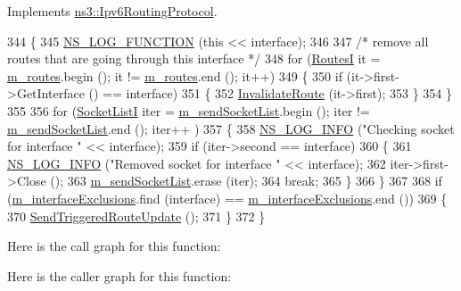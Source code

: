 Implements \hyperlink{classns3_1_1Ipv6RoutingProtocol_aa9b4c21a3878a1b808c9ac9d26c914bf}{ns3\+::\+Ipv6\+Routing\+Protocol}.


\begin{DoxyCode}
344 \{
345   \hyperlink{log-macros-disabled_8h_a90b90d5bad1f39cb1b64923ea94c0761}{NS\_LOG\_FUNCTION} (\textcolor{keyword}{this} << interface);
346 
347   \textcolor{comment}{/* remove all routes that are going through this interface */}
348   \textcolor{keywordflow}{for} (\hyperlink{classns3_1_1RipNg_aa8bc6103d67089e1e3cd507936f94887}{RoutesI} it = \hyperlink{classns3_1_1RipNg_acfc1011b140f9e612a8c27c9bfb4c6b5}{m\_routes}.begin (); it != \hyperlink{classns3_1_1RipNg_acfc1011b140f9e612a8c27c9bfb4c6b5}{m\_routes}.end (); it++)
349     \{
350       \textcolor{keywordflow}{if} (it->first->GetInterface () == interface)
351         \{
352           \hyperlink{classns3_1_1RipNg_ae4fc1ca9ed948f3c028fd96fb016f7dd}{InvalidateRoute} (it->first);
353         \}
354     \}
355 
356   \textcolor{keywordflow}{for} (\hyperlink{classns3_1_1RipNg_a549052bbb55168d029f82d78384144b4}{SocketListI} iter = \hyperlink{classns3_1_1RipNg_a761d304dc3d34cd528afe87c5fa8090b}{m\_sendSocketList}.begin (); iter != 
      \hyperlink{classns3_1_1RipNg_a761d304dc3d34cd528afe87c5fa8090b}{m\_sendSocketList}.end (); iter++ )
357     \{
358       \hyperlink{group__logging_gafbd73ee2cf9f26b319f49086d8e860fb}{NS\_LOG\_INFO} (\textcolor{stringliteral}{"Checking socket for interface "} << interface);
359       \textcolor{keywordflow}{if} (iter->second == interface)
360         \{
361           \hyperlink{group__logging_gafbd73ee2cf9f26b319f49086d8e860fb}{NS\_LOG\_INFO} (\textcolor{stringliteral}{"Removed socket for interface "} << interface);
362           iter->first->Close ();
363           \hyperlink{classns3_1_1RipNg_a761d304dc3d34cd528afe87c5fa8090b}{m\_sendSocketList}.erase (iter);
364           \textcolor{keywordflow}{break};
365         \}
366     \}
367 
368   \textcolor{keywordflow}{if} (\hyperlink{classns3_1_1RipNg_a98c5b63bb7c56afa595c1bb568a7081f}{m\_interfaceExclusions}.find (interface) == 
      \hyperlink{classns3_1_1RipNg_a98c5b63bb7c56afa595c1bb568a7081f}{m\_interfaceExclusions}.end ())
369     \{
370       \hyperlink{classns3_1_1RipNg_ad7a8e445116b3dd8cdd1d50366787c66}{SendTriggeredRouteUpdate} ();
371     \}
372 \}
\end{DoxyCode}


Here is the call graph for this function\+:




Here is the caller graph for this function\+:


